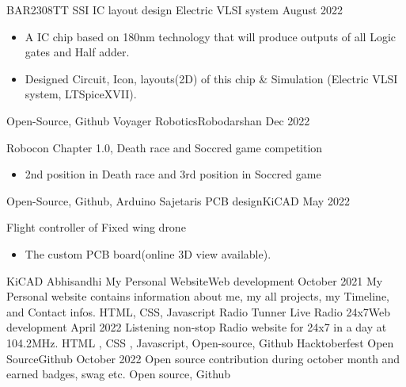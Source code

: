 %
%
%

\begin{experiences}
  \experience
    {BAR2308TT}   {SSI IC layout design }{Electric VLSI system}{}
    {August 2022} {
                      \begin{itemize}
                       \item A IC chip based on 180nm technology that will produce outputs of all Logic gates and Half adder.
                       \item Designed Circuit, Icon, layouts(2D) of this chip \& Simulation (Electric VLSI system, LTSpiceXVII).
                      \end{itemize}
                    }
                    {Open-Source, Github}
  \emptySeparator
  \experience
    {Voyager}  {Robotics}{Robodarshan}{}
    {Dec 2022}     {
                    Robocon Chapter 1.0, Death race and Soccred game competition
                    \begin{itemize}
                        \item 2nd position in Death race and 3rd position in Soccred game
                    \end{itemize}
                     }
                     {Open-Source, Github, Arduino}
  \emptySeparator
  \experience
    {Sajetaris} {PCB design}{KiCAD}{}
    {May 2022}    {
                   Flight controller of Fixed wing drone
                    \begin{itemize}
                       \item The custom PCB board(online 3D view available).
                      \end{itemize}
                    }
                    {KiCAD}
  \emptySeparator
  \experience
    {Abhisandhi}     {My Personal Website}{Web development}{}
    {October 2021}    {
                     My Personal website contains information about me, my all projects, my Timeline, and Contact infos.
                    }
                    { HTML, CSS, Javascript}
  \emptySeparator
 \experience
    {Radio Tunner}   {Live Radio 24x7}{Web development}{}
    {April 2022} {
                      Listening non-stop Radio website for 24x7 in a day at 104.2MHz.
                    }
                    {HTML , CSS , Javascript, Open-source, Github}
    \emptySeparator
 \experience
    {Hacktoberfest}   {Open Source}{Github}{}
    {October 2022} {
                      Open source contribution during october month and earned badges, swag etc.
                    }
                    {Open source, Github}
\end{experiences}
